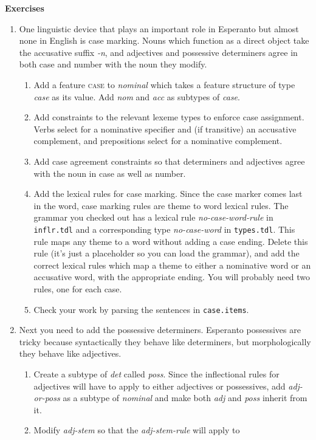 \documentclass[11pt]{article}
\begin{document}
\smallskip
\noindent\textbf{Exercises}
\begin{enumerate}
\item One linguistic device that plays an important role in Esperanto but
almost none in English is case marking.  Nouns which function as a direct
object take the accusative suffix \emph{-n}, and adjectives and possessive
determiners agree in both case and number with the noun they modify.
\begin{enumerate}
\item Add a feature \textsc{case} to \emph{nominal} which takes a feature
structure of type \emph{case} as its value.  Add \emph{nom} and \emph{acc} as 
subtypes of \emph{case}.  
\item Add constraints to the relevant lexeme types to enforce case assignment.
Verbs select for a nominative specifier and (if transitive) an accusative
complement, and prepositions select for a nominative complement.
\item Add case agreement constraints so that determiners and adjectives agree
with the noun in case as well as number.
\item Add the lexical rules for case marking.  Since the case marker comes
last in the word, case marking rules are theme to word lexical rules.  The
grammar you checked out has a lexical rule \emph{no-case-word-rule} in
\texttt{inflr.tdl} and a corresponding type \emph{no-case-word} in
\texttt{types.tdl}.  This rule maps any theme to a word without adding a case
ending.  Delete this rule (it's just a placeholder so you can load the
grammar), and add the correct lexical rules which map a theme to either a
nominative word or an accusative word, with the appropriate ending.  You will
probably need two rules, one for each case.
\item Check your work by parsing the sentences in \texttt{case.items}.
\end{enumerate}
\item Next you need to add the possessive determiners.  Esperanto possessives
are tricky because syntactically they behave like determiners, but
morphologically they behave like adjectives.
\begin{enumerate}
\item Create a subtype of \emph{det} called \emph{poss}.  Since the
inflectional rules for adjectives will have to apply to either adjectives or
possessives, add \emph{adj-or-poss} as a subtype of \emph{nominal} and make 
both \emph{adj} and \emph{poss} inherit from it.
\item Modify \emph{adj-stem} so that the \emph{adj-stem-rule} will apply to 

\end{enumerate}
\end{enumerate}
\end{document}
